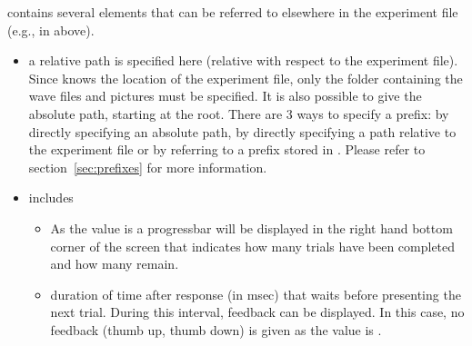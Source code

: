  contains several  elements that
can be referred to elsewhere in the experiment file (e.g., in
 above).

\begin{itemize}
\item {} a relative path is specified here
(relative with respect to the experiment file). Since \apex knows
the location of the experiment file, only the folder containing
the wave files and pictures must be specified. It is also possible
to give the absolute path, starting at the root. There are 3 ways
to specify a prefix: by directly specifying an absolute path, by
directly specifying a path relative to the experiment file or by
referring to a prefix stored in . Please
refer to section~\ref{sec:prefixes} for more information.

\item {} includes

\begin{itemize}

\item {} As the value is  a
progressbar will be displayed in the right hand bottom corner of
the screen that indicates how many trials have been completed and
how many remain.

\item {} duration of time after response
(in msec) that \apex waits before presenting the next trial.
During this interval, feedback can be displayed. In this case, no
feedback (thumb up, thumb down) is given as the value is
.

\end{itemize}
\end{itemize}

